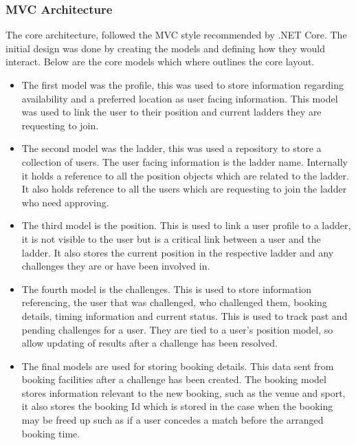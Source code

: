 \subsubsection{MVC Architecture}
\par
The core architecture, followed the MVC style recommended by .NET Core. The initial design was done by creating the models and defining how they would interact. Below are the core models which where outlines the core layout.

\begin{itemize}

	\item The first model was the profile, this was used to store information regarding availability and a preferred location as user facing information. This model was used to link the user to their position and current ladders they are requesting to join.

	\item The second model was the ladder, this was used a repository to store a collection of users. The user facing information is the ladder name. Internally it holds a reference to all the position objects which are related to the ladder. It also holds reference to all the users which are requesting to join the ladder who need approving.

	\item The third model is the position. This is used to link a user profile to a ladder, it is not visible to the user but is a critical link between a user and the ladder. It also stores the current position in the respective ladder and any challenges they are or have been involved in.

	\item The fourth model is the challenges. This is used to store information referencing, the user that was challenged, who challenged them, booking details, timing information and current status. This is used to track past and pending challenges for a user. They are tied to a user’s position model, so allow updating of results after a challenge has been resolved.

	\item The final models are used for storing booking details. This data sent from booking facilities after a challenge has been created. The booking model stores information relevant to the new booking, such as the venue and sport, it also stores the booking Id which is stored in the case when the booking may be freed up such as if a user concedes a match before the arranged booking time.

\end{itemize}

